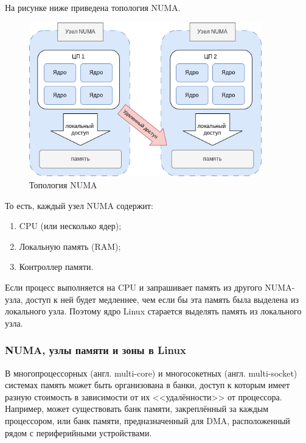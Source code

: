 На рисунке ниже приведена топология NUMA.

\begin{figure}[H]
	\centering
	\includegraphics[width=0.9\textwidth]{img/numa.png}
	\caption{Топология NUMA}
	\label{fig:numa}
\end{figure}

То есть, каждый узел NUMA содержит:
\begin{enumerate}
    \item CPU (или несколько ядер);
    \item Локальную память (RAM);
    \item Контроллер памяти.
\end{enumerate}

Если процесс выполняется на CPU и запрашивает память из другого NUMA-узла, доступ к ней будет медленнее, чем если бы эта память была выделена из локального узла.
Поэтому ядро Linux старается выделять память из локального узла.


\subsubsection{NUMA, узлы памяти и зоны в Linux}

В многопроцессорных (англ. multi-core) и многосокетных (англ. multi-socket) системах память может быть организована в банки, доступ к которым имеет разную стоимость в зависимости от их <<удалённости>> от процессора.
Например, может существовать банк памяти, закреплённый за каждым процессором, или банк памяти, предназначенный для DMA, расположенный рядом с периферийными устройствами.


